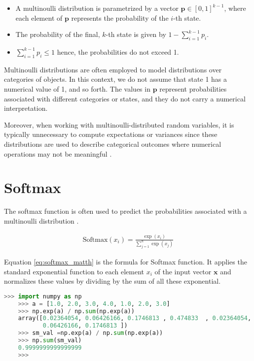 \begin{itemize}
    \item A multinoulli distribution is parametrized by a vector $\mathbf{p} \in [0, 1]^{k-1}$, where each element of $\mathbf{p}$ represents the probability of the $i$-th state. 
    \item  The probability of the final, $k$-th state is given by $1 - \sum_{i=1}^{k-1} p_i$. 
    \item  $\sum_{i=1}^{k-1} p_i \leq 1$ hence, the probabilities do not exceed 1. 
\end{itemize}



Multinoulli distributions are often employed to model distributions over categories of objects. In this context, we do not assume that state 1 has a numerical value of 1, and so forth. The values in $\mathbf{p}$ represent probabilities associated with different categories or states, and they do not carry a numerical interpretation.

Moreover, when working with multinoulli-distributed random variables, it is typically unnecessary to compute expectations or variances since these distributions are used to describe categorical outcomes where numerical operations may not be meaningful \parencite[Page 60,61]{Goodfellow-et-al-2016}. 


\section{Softmax}

The softmax function is often used to predict the probabilities associated with a multinoulli distribution \parencite[Page 79]{Goodfellow-et-al-2016}.

\begin{align}
    \text{Softmax}(x_i) = \frac{{\exp(x_i)}}{{\sum_{j=1}^n \exp(x_j)}} \label{eq:softmax_matth}
\end{align}

Equation \ref{eq:softmax_matth} is the formula for Softmax function. It applies the standard exponential function to each element $ x_i $ of the input vector $ \mathbf{x} $  and normalizes these values by dividing by the sum of all these exponential. 

\begin{lstlisting}[language=Python,caption={Python example for softmax},label=code:sample_softmax]
    >>> import numpy as np
    >>> a = [1.0, 2.0, 3.0, 4.0, 1.0, 2.0, 3.0]
    >>> np.exp(a) / np.sum(np.exp(a))
    array([0.02364054, 0.06426166, 0.1746813 , 0.474833  , 0.02364054,
           0.06426166, 0.1746813 ])
    >>> sm_val =np.exp(a) / np.sum(np.exp(a))
    >>> np.sum(sm_val)
    0.9999999999999999
    >>>
\end{lstlisting}

